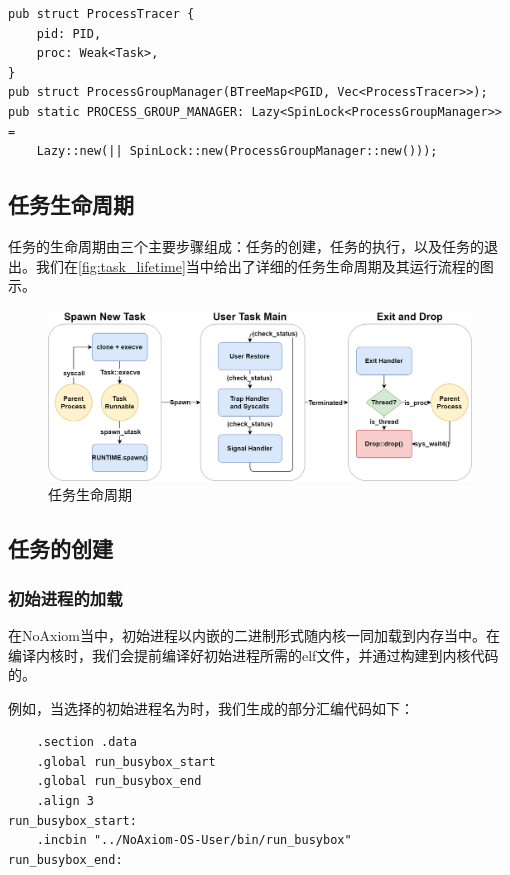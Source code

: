 \documentclass{article}
\begin{document}
\begin{lstlisting}
pub struct ProcessTracer {
    pid: PID,
    proc: Weak<Task>,
}
pub struct ProcessGroupManager(BTreeMap<PGID, Vec<ProcessTracer>>);
pub static PROCESS_GROUP_MANAGER: Lazy<SpinLock<ProcessGroupManager>> =
    Lazy::new(|| SpinLock::new(ProcessGroupManager::new()));
\end{lstlisting}

\subsection{任务生命周期}

任务的生命周期由三个主要步骤组成：任务的创建，任务的执行，以及任务的退出。我们在\autoref{fig:task_lifetime}当中给出了详细的任务生命周期及其运行流程的图示。

\begin{figure}[H]
    \centering
    \includegraphics[width=1\linewidth]{assets//task/task_lifetime.drawio.png}
    \caption{任务生命周期}
    \label{fig:task_lifetime}
\end{figure}

\subsection{任务的创建}

\subsubsection{初始进程的加载}

在NoAxiom当中，初始进程以内嵌的二进制形式随内核一同加载到内存当中。在编译内核时，我们会提前编译好初始进程所需的elf文件，并通过构建到内核代码的。

例如，当选择的初始进程名为时，我们生成的部分汇编代码如下：

\begin{lstlisting}
    .section .data
    .global run_busybox_start
    .global run_busybox_end
    .align 3
run_busybox_start:
    .incbin "../NoAxiom-OS-User/bin/run_busybox"
run_busybox_end:
\end{lstlisting}
\end{document}
